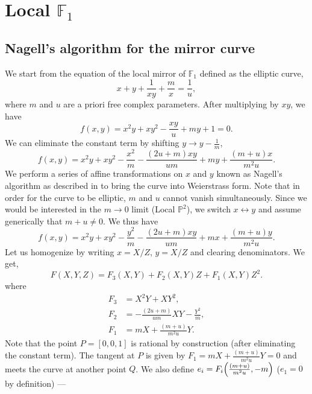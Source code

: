 \documentclass[11pt, a4paper]{article}
\numberwithin{equation}{section}
\begin{document}
\section{Local \texorpdfstring{$\mathbb{F}_1$}{F1}}


\subsection{Nagell's algorithm for the mirror curve}
We start from the equation of the local mirror of $\mathbb{F}_1$ defined as the elliptic curve,
\begin{equation}\label{eqn:F1mirror}
  x + y + \frac{1}{x y} + \frac{m}{x} = \frac{1}{u},
\end{equation}
where $m$ and $u$ are a priori free complex parameters. After multiplying by $x y$, we have
\begin{equation}
  f(x, y) = x^2 y + x y^2 - \frac{x y}{u} + m y + 1 = 0.
\end{equation}
We can eliminate the constant term by shifting $y \to y - \frac{1}{m}$,
\begin{equation}
  f(x, y) = x^2 y + x y^2 - \frac{x^2}{m} - \frac{(2u + m) x y}{u m} + m y + \frac{(m + u)x}{m^2 u}.
\end{equation}
We perform a series of affine transformations on $x$ and $y$ known as Nagell's algorithm as described in \cite{ConnellHandbook} to bring the curve into Weierstrass form. Note that in order for the curve to be elliptic, $m$ and $u$ cannot vanish simultaneously. Since we would be interested in the $m \to 0$ limit (Local $\mathbb{P}^2$), we switch $x \leftrightarrow y$ and assume generically that $m + u \neq 0$. We thus have
\begin{equation}
  f(x, y) = x^2 y + x y^2 - \frac{y^2}{m} - \frac{(2u + m) x y}{u m} + m x + \frac{(m + u)y}{m^2 u}.
\end{equation}
Let us homogenize by writing $x = X/Z$, $y = X/Z$ and clearing denominators. We get,
\begin{equation}
  F(X, Y, Z) = F_3(X, Y) + F_2(X, Y) Z + F_1(X, Y) Z^2.
\end{equation}
where
\begin{align}
  F_3 &= X^2 Y + X Y^2, \\
  F_2 &= -\frac{(2u + m)}{u m} X Y - \frac{Y^2}{m}, \\
  F_1 &= m X + \frac{(m+u)}{m^2 u}  Y.
\end{align}
Note that the point $P = [0, 0, 1]$ is rational by construction (after eliminating the constant term). The tangent at $P$ is given by $F_1 = m X + \frac{(m+u)}{m^2 u} Y = 0$ and meets the curve at another point $Q$. We also define $e_i = F_i\qty(\frac{(m+u)}{m^2 u}, -m)$ ($e_1 = 0$ by definition) ---
\end{document}
